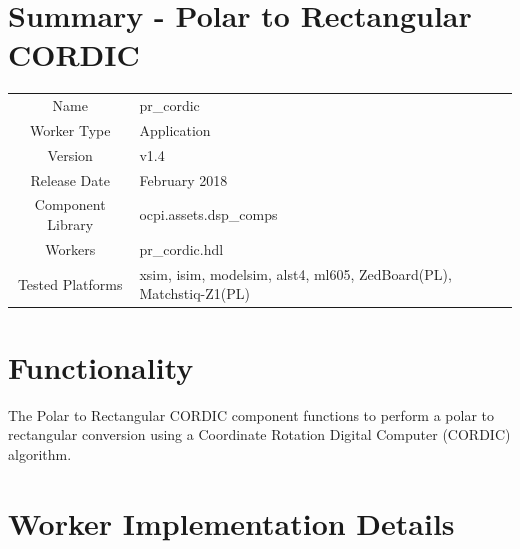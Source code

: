 \documentclass{article}
\author{} %
\date{Version \docVersion} %
\title{\docTitle}
\def\docVersion{1.4}
\def\comp{pr\_cordic}
\def\Comp{Polar to Rectangular CORDIC}
\begin{document}
\section*{Summary - \Comp}
\begin{tabular}{|c|M{13.5cm}|}
	\hline
	                  &                                                              \\
	\hline
	Name              & \comp                                                        \\
	\hline
	Worker Type       & Application                                                  \\
	\hline
	Version           & v\docVersion \\
	\hline
	Release Date      & February 2018 \\
	\hline
	Component Library & ocpi.assets.dsp\_comps                                        \\
	\hline
	Workers           & \comp.hdl                                                    \\
	\hline
	Tested Platforms  & xsim, isim, modelsim, alst4, ml605, ZedBoard(PL), Matchstiq-Z1(PL) \\
	\hline
\end{tabular}

\section*{Functionality}
\begin{flushleft}
	The {\Comp} component functions to perform a polar to rectangular conversion using a Coordinate Rotation Digital Computer (CORDIC) algorithm.
\end{flushleft}

\section*{Worker Implementation Details}
\end{document}
